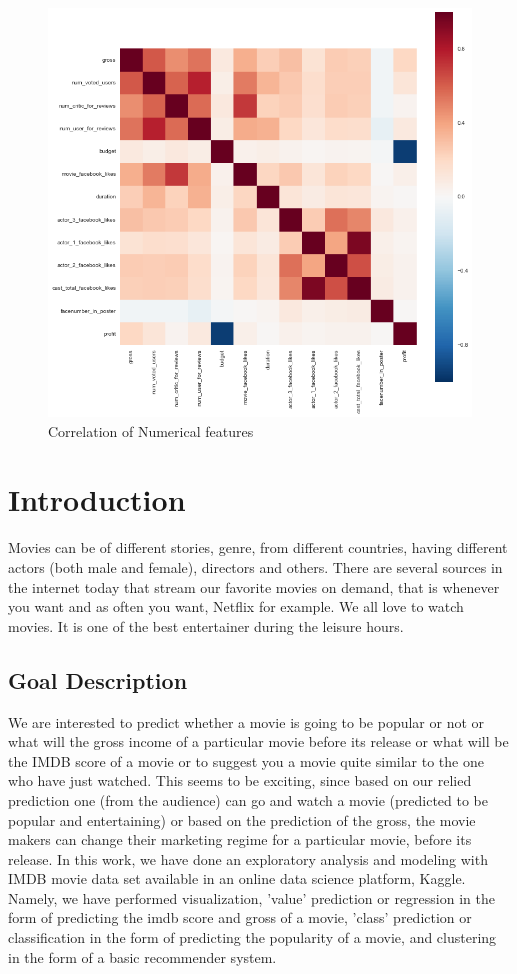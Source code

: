 \documentclass{article}%
\begin{document}
\begin{figure}
\centering
\includegraphics[width=1.0\columnwidth]{Fig/Correlationoffeatures.png}
\caption{Correlation of Numerical features}
\label{fig:Correlationoffeatures}
\end{figure}


\section{Introduction}

Movies can be of different stories, genre, from different countries, having different actors (both male and female), directors and others. There are several sources in the internet today that stream our favorite movies on demand, that is whenever you want and as often you want, Netflix for example. We all love to watch movies. It is one of the best entertainer during the leisure hours. 

\subsection{Goal Description}

We are interested to predict whether a movie is going to be popular or not or what will the gross income of a particular movie before its release or what will be the IMDB score of a movie or to suggest you a movie quite similar to the one who have just watched. This seems to be exciting, since based on our relied prediction one (from the audience) can go and watch a movie (predicted to be popular and entertaining) or based on the prediction of the gross, the movie makers can change their marketing regime for a particular movie,  before its release. 
In this work, we have done an exploratory analysis and modeling with IMDB movie data set available in an online data science platform, Kaggle. Namely, we have performed visualization, 'value' prediction or regression in the form of predicting the imdb score and gross of a movie, 'class' prediction or classification in the form of predicting the popularity of a movie, and clustering in the form of a basic recommender system.
\end{document}
